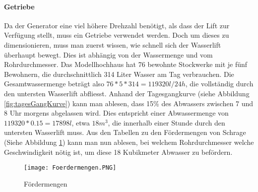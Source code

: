 \paragraph{Getriebe}
Da der Generator eine viel höhere Drehzahl benötigt, als dass der Lift zur Verfügung stellt, muss ein Getriebe verwendet werden. Doch um dieses zu dimensionieren, muss man zuerst wissen, wie schnell sich der Wasserlift überhaupt bewegt. Dies ist abhängig von der Wassermenge und vom Rohrdurchmesser. Das Modellhochhaus hat 76 bewohnte Stockwerke mit je fünf Bewohnern, die durchschnittlich 314 Liter Wasser am Tag verbrauchen. Die Gesamtwassermenge beträgt also \(76 * 5 * 314 = 119320 l/24h\), die vollständig durch den untersten Wasserlift abfliesst. Anhand der Tagesgangkurve (siehe Abbildung \ref{fig:tagesGangKurve}) kann man ablesen, dass 15\% des Abwassers zwischen 7 und 8 Uhr morgens abgelassen wird. Dies entspricht einer Abwassermenge von \(119320 * 0.15 = 17898 l\), etwa \(18 m^3 \), die innerhalb einer Stunde durch den untersten Wasserlift muss. Aus den Tabellen zu den Fördermengen von Schrage (Siehe Abbildung \ref{fig:foerdermengen}) kann man nun ablesen, bei welchem Rohrdurchmesser welche Geschwindigkeit nötig ist, um diese 18 Kubikmeter Abwasser zu befördern. 

\begin{figure} [H]
	\centering
	\texttt{[image: Foerdermengen.PNG]}
	\caption{Fördermengen \cite{schrage}}
	\label{fig:foerdermengen}
\end{figure}

